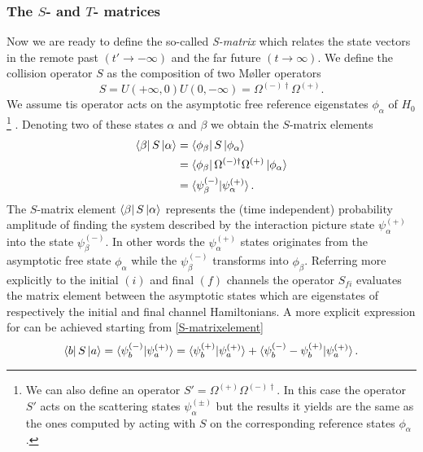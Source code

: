 \documentclass[11pt]{article}
\numberwithin{equation}{section}
\begin{document}
\subsubsection{The $S$- and $T$- matrices}\label{sec:SandT}
Now we are ready to define the so-called \emph{S-matrix} which relates the state vectors in the remote past $(t' \rightarrow - \infty)$ and the far future $(t \rightarrow \infty)$. We define the collision operator $S$ as the composition of two M\o ller operators
\begin{equation}
	S = U(+\infty, 0)U(0, -\infty) = \Omega^{(-) \dagger}\Omega^{(+)}.
\end{equation}
We assume tis operator acts on the asymptotic free reference eigenstates $\phi_{\alpha}$ of $H_0$ \footnote{
We can also define an operator $S' = \Omega^{(+)}\Omega^{(-) \dagger}$. In this case the operator $S'$ acts on the scattering states $\psi^{(\pm)}_{\alpha}$ but the results it yields are the same as the ones computed by acting with $S$ on the corresponding reference states $\phi_{\alpha}$.

}
. Denoting two of these states $\alpha$ and $\beta$ we obtain the $S$-matrix elements
\begin{align}\label{S-matrixelement}
\begin{split}	
\bra{\beta} S \ket{\alpha} &= \bra{\phi_{\beta}} S \ket{\phi_{\alpha}} \\
&=  \bra{\phi_{\beta}} \Omega^{(-) \dagger}\Omega^{(+)}\ket{\phi_{\alpha}}\\
&= 	\braket{\psi^{(-)}_{\beta} |\psi^{(+)}_{\alpha}}.
\end{split}
\end{align}
The $S$-matrix element $\bra{\beta} S \ket{\alpha}$ represents the (time independent) probability amplitude of finding the system described by the interaction picture state $\psi^{(+)}_{\alpha}$ into the state $\psi^{(-)}_{\beta}$. In other words the $\psi^{(+)}_{\alpha}$ states originates from the asymptotic free state $\phi_{\alpha}$ while the $\psi^{(-)}_{\beta}$ transforms into $\phi_{\beta}$. Referring more explicitly to the initial $(i)$ and final $(f)$ channels the operator $S_{fi}$ evaluates the matrix element between the asymptotic states which are eigenstates of respectively the initial and final channel Hamiltonians. A more explicit expression for can be achieved starting from \eqref{S-matrixelement}
\begin{equation}
	\bra{b} S \ket{a} = \braket{\psi^{(-)}_b | \psi^{(+)}_a} = \braket{\psi^{(+)}_b | \psi^{(+)}_a} + \braket{\psi^{(-)}_b - \psi^{(+)}_b| \psi^{(+)}_a}.
\end{equation}
\end{document}
